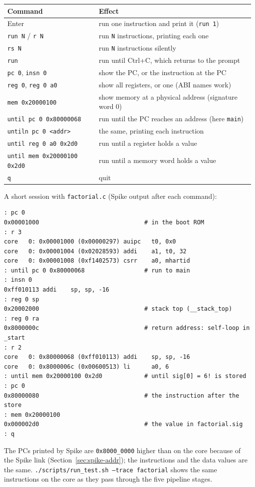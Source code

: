 \begin{center}
\small
\begin{tabularx}{\linewidth}{@{}l X@{}}
\toprule
Command & Effect \\
\midrule
Enter & run one instruction and print it (\texttt{run 1}) \\
\texttt{run N} / \texttt{r N} & run \texttt{N} instructions, printing each one \\
\texttt{rs N} & run \texttt{N} instructions silently \\
\texttt{run} & run until Ctrl+C, which returns to the prompt \\
\texttt{pc 0}, \texttt{insn 0} & show the PC, or the instruction at the PC \\
\texttt{reg 0}, \texttt{reg 0 a0} & show all registers, or one (ABI names work) \\
\texttt{mem 0x20000100} & show memory at a physical address (signature word 0) \\
\texttt{until pc 0 0x80000068} & run until the PC reaches an address (here \texttt{main}) \\
\texttt{untiln pc 0 <addr>} & the same, printing each instruction \\
\texttt{until reg 0 a0 0x2d0} & run until a register holds a value \\
\texttt{until mem 0x20000100 0x2d0} & run until a memory word holds a value \\
\texttt{q} & quit \\
\bottomrule
\end{tabularx}
\end{center}

A short session with \texttt{factorial.c} (Spike output after each command):
\begin{lstlisting}[style=minrv]
: pc 0
0x00001000                              # in the boot ROM
: r 3
core   0: 0x00001000 (0x00000297) auipc   t0, 0x0
core   0: 0x00001004 (0x02028593) addi    a1, t0, 32
core   0: 0x00001008 (0xf1402573) csrr    a0, mhartid
: until pc 0 0x80000068                 # run to main
: insn 0
0xff010113 addi    sp, sp, -16
: reg 0 sp
0x20002000                              # stack top (__stack_top)
: reg 0 ra
0x8000000c                              # return address: self-loop in _start
: r 2
core   0: 0x80000068 (0xff010113) addi    sp, sp, -16
core   0: 0x8000006c (0x00600513) li      a0, 6
: until mem 0x20000100 0x2d0            # until sig[0] = 6! is stored
: pc 0
0x80000080                              # the instruction after the store
: mem 0x20000100
0x000002d0                              # the value in factorial.sig
: q
\end{lstlisting}
The PCs printed by Spike are \texttt{0x8000\_0000} higher than on the core
because of the Spike link (Section~\ref{sec:spike-addr}); the instructions and
the data values are the same. \texttt{./scripts/run\_test.sh --trace factorial}
shows the same instructions on the core as they pass through the five pipeline
stages.

